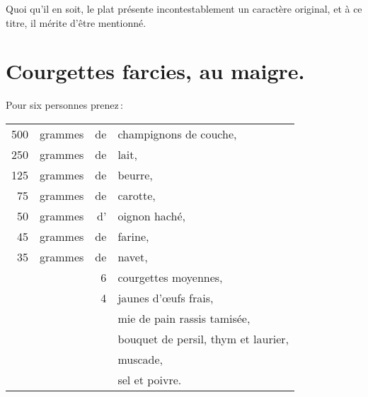 Quoi qu'il en soit, le plat présente incontestablement un caractère original,
et à ce titre, il mérite d'être mentionné.

\section*{\centering Courgettes farcies, au maigre.}
{}

Pour six personnes prenez :

\footnotesize
\begin{longtable}{rrrp{16em}}
    500 & grammes & de & champignons de couche,                                                           \\
    250 & grammes & de & lait,                                                                            \\
    125 & grammes & de & beurre,                                                                          \\
     75 & grammes & de & carotte,                                                                         \\
     50 & grammes & d' & oignon haché,                                                                    \\
     45 & grammes & de & farine,                                                                          \\
     35 & grammes & de & navet,                                                                           \\
        &         &  6 & courgettes moyennes,                                                             \\
        &         &  4 & jaunes d'œufs frais,                                                             \\
        &         &    & mie de pain rassis tamisée,                                                      \\
        &         &    & bouquet de persil, thym et laurier,                                              \\
        &         &    & muscade,                                                                         \\
        &         &    & sel et poivre.                                                                   \\
\end{longtable}
\normalsize

